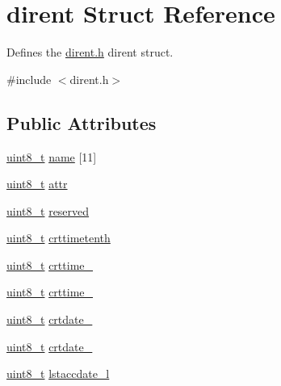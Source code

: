 \hypertarget{structdirent}{}\section{dirent Struct Reference}
\label{structdirent}


Defines the \mbox{\hyperlink{dirent_8h}{dirent.\+h}} dirent struct.  




{\ttfamily \#include $<$dirent.\+h$>$}

\subsection*{Public Attributes}
\begin{DoxyCompactItemize}
\item 
\mbox{\hyperlink{stdint_8h_aba7bc1797add20fe3efdf37ced1182c5}{uint8\+\_\+t}} \mbox{\hyperlink{structdirent_a5f4ed9b26e0cbb4d1e85bf27b3e11d4d}{name}} \mbox{[}11\mbox{]}
\item 
\mbox{\hyperlink{stdint_8h_aba7bc1797add20fe3efdf37ced1182c5}{uint8\+\_\+t}} \mbox{\hyperlink{structdirent_a740c77a396a169bcba56d64b68d30715}{attr}}
\item 
\mbox{\hyperlink{stdint_8h_aba7bc1797add20fe3efdf37ced1182c5}{uint8\+\_\+t}} \mbox{\hyperlink{structdirent_a9219e6a97f3e1eef1e44c72d14ae72ee}{reserved}}
\item 
\mbox{\hyperlink{stdint_8h_aba7bc1797add20fe3efdf37ced1182c5}{uint8\+\_\+t}} \mbox{\hyperlink{structdirent_a66fbef238aa58e10823a0ff52427bdaf}{crttimetenth}}
\item 
\mbox{\hyperlink{stdint_8h_aba7bc1797add20fe3efdf37ced1182c5}{uint8\+\_\+t}} \mbox{\hyperlink{structdirent_a88d54669d58844277d63d00962f1bf6f}{crttime\+\_}}
\item 
\mbox{\hyperlink{stdint_8h_aba7bc1797add20fe3efdf37ced1182c5}{uint8\+\_\+t}} \mbox{\hyperlink{structdirent_aa596c172166b19094754f29f178296e4}{crttime\+\_}}
\item 
\mbox{\hyperlink{stdint_8h_aba7bc1797add20fe3efdf37ced1182c5}{uint8\+\_\+t}} \mbox{\hyperlink{structdirent_a640fc8212e5728a781366f590c607e21}{crtdate\+\_}}
\item 
\mbox{\hyperlink{stdint_8h_aba7bc1797add20fe3efdf37ced1182c5}{uint8\+\_\+t}} \mbox{\hyperlink{structdirent_aac924b6ad7c5847c357416e32a864a54}{crtdate\+\_}}
\item 
\mbox{\hyperlink{stdint_8h_aba7bc1797add20fe3efdf37ced1182c5}{uint8\+\_\+t}} \mbox{\hyperlink{structdirent_abc055613885859998a5493153544f714}{lstaccdate\+\_\+l}}

\end{DoxyCompactItemize}
